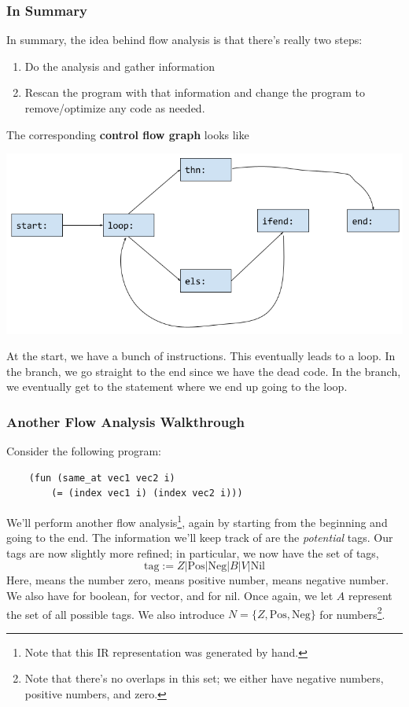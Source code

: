 \subsubsection{In Summary}
In summary, the idea behind flow analysis is that there's really two steps: 
\begin{enumerate}
    \item Do the analysis and gather information 
    \item Rescan the program with that information and change the program to remove/optimize any code as needed. 
\end{enumerate}
The corresponding \textbf{control flow graph} looks like 
\begin{center}
    \includegraphics[scale=0.5]{assets/analysis_flow_graph.png}
\end{center}
At the start, we have a bunch of instructions. This eventually leads to a loop. In the  branch, we go straight to the end since we have the dead code. In the  branch, we eventually get to the  statement where we end up going to the loop.

\thispagestyle{noheader}

\subsubsection{Another Flow Analysis Walkthrough}
Consider the following program: 
\begin{verbatim}
    (fun (same_at vec1 vec2 i)
        (= (index vec1 i) (index vec2 i)))\end{verbatim}
We'll perform another flow analysis\footnote{Note that this IR representation was generated by hand.}, again by starting from the beginning and going to the end. The information we'll keep track of are the \emph{potential} tags. Our tags are now slightly more refined; in particular, we now have the set of tags, 
\[\text{tag} := Z | \text{Pos} | \text{Neg} | B | V | \text{Nil}\]
Here,  means the number zero,  means positive number,  means negative number. We also have  for boolean,  for vector, and  for nil. Once again, we let $A$ represent the set of all possible tags. We also introduce $N = \{Z, \text{Pos}, \text{Neg}\}$ for numbers\footnote{Note that there's no overlaps in this set; we either have negative numbers, positive numbers, and zero.}. 

